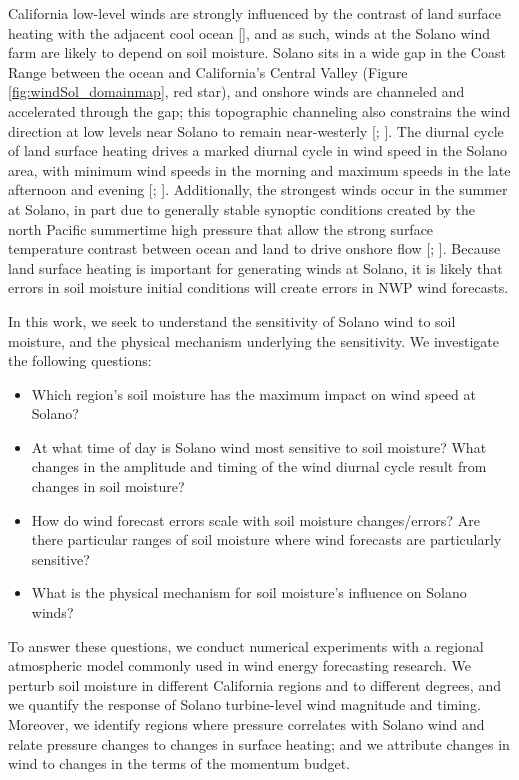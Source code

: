 California low-level winds are strongly influenced by the contrast of land surface heating with the adjacent cool ocean [\cite{zhong2004diurnal}], and as such, winds at the Solano wind farm are likely to depend on soil moisture.  Solano sits in a wide gap in the Coast Range between the ocean and California's Central Valley (Figure \ref{fig:windSol_domainmap}, red star), and onshore winds are channeled and accelerated through the gap; this topographic channeling also constrains the wind direction at low levels near Solano to remain near-westerly [\cite{zhong2004diurnal}; \cite{mansbach2010synoptic}].  The diurnal cycle of land surface heating drives a marked diurnal cycle in wind speed in the Solano area, with minimum wind speeds in the morning and maximum speeds in the late afternoon and evening [\cite{zhong2004diurnal}; \cite{mansbach2010synoptic}].  Additionally, the strongest winds occur in the summer at Solano, in part due to generally stable synoptic conditions created by the north Pacific summertime high pressure that allow the strong surface temperature contrast between ocean and land to drive onshore flow [\cite{zhong2004diurnal}; \cite{mansbach2010synoptic}]. Because land surface heating is important for generating winds at Solano, it is likely that errors in soil moisture initial conditions will create errors in NWP wind forecasts.

In this work, we seek to understand the sensitivity of Solano wind to soil moisture, and the physical mechanism underlying the sensitivity.  We investigate the following questions:
\begin{itemize}
\item Which region's soil moisture has the maximum impact on wind speed at Solano?
\item At what time of day is Solano wind most sensitive to soil moisture?  What changes in the amplitude and timing of the wind diurnal cycle result from changes in soil moisture?
\item How do wind forecast errors scale with soil moisture changes/errors?  Are there particular ranges of soil moisture where wind forecasts are particularly sensitive?
\item What is the physical mechanism for soil moisture's influence on Solano winds?
\end{itemize}

To answer these questions, we conduct numerical experiments with a regional atmospheric model commonly used in wind energy forecasting research.  We perturb soil moisture in different California regions and to different degrees, and we quantify the response of Solano turbine-level wind magnitude and timing.  Moreover, we identify regions where pressure correlates with Solano wind and relate pressure changes to changes in surface heating; and we attribute changes in wind to changes in the terms of the momentum budget.

